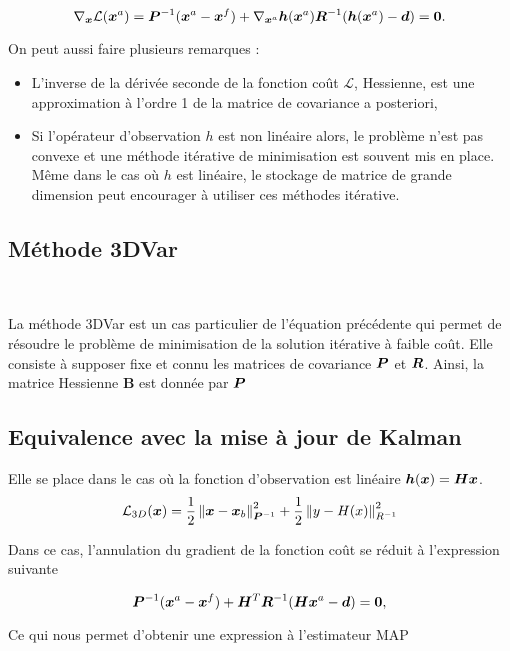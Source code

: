 \begin{equation*}
    \nabla_{\bm{x}} \mathcal L(\bm{x}^a) = \bm{P}^{-1} (\bm{x}^a - \bm{x}^f) + \nabla_{\bm{x}^a} \bm h (\bm{x}^a) \bm{R}^{-1}(\bm{h}(\bm{x}^a) - \bm d) = \bm 0.
\end{equation*}


On peut aussi faire plusieurs remarques :

\begin{itemize}
    \item L'inverse de la dérivée seconde de la fonction coût $\mathcal L$, Hessienne, est une approximation à l'ordre 1 de la matrice de covariance a posteriori,
    \item Si l'opérateur d'observation $h$ est non linéaire alors, le problème n'est pas convexe et une méthode itérative de minimisation est souvent mis en place. Même dans le cas où $h$ est linéaire, le stockage de matrice de grande dimension peut encourager à utiliser ces méthodes itérative.
\end{itemize}

\subsection{Méthode 3DVar}~\label{subsec:3dvar}

La méthode 3DVar est un cas particulier de l'équation précédente qui permet de résoudre le problème de minimisation de la solution itérative à faible coût. Elle consiste à supposer fixe et connu les matrices de covariance $\bm{P}$ et $\bm{R}$. Ainsi, la matrice Hessienne $\bm B$ est donnée par $\bm{P}$

\subsection{Equivalence avec la mise à jour de Kalman}

Elle se place dans le cas où la fonction d'observation est linéaire $\bm h(\bm{x}) = \bm{H} \bm{x}$.
$$\mathcal L_{3D}(\bm{x}) = \frac{1}{2}\left\lVert \bm{x}-\bm{x}_b \right\rVert_{\bm{P}^{-1}}^2+ \frac{1}{2}\left\lVert y-H(x) \right\rVert^2_{R^{-1}}$$

Dans ce cas, l'annulation du gradient de la fonction coût se réduit à l'expression suivante

\begin{equation*}
    \bm{P}^{-1} (\bm{x}^a - \bm{x}^f) + \bm{H}^T \bm{R}^{-1}(\bm{H} \bm{x}^a - \bm d) = \bm 0,
\end{equation*}

Ce qui nous permet d'obtenir une expression à l'estimateur MAP

